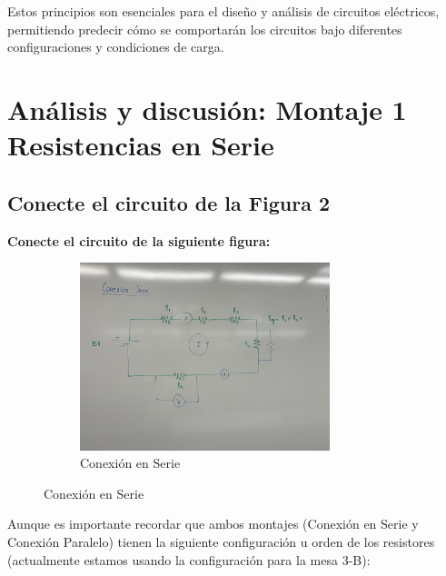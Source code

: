 Estos principios son esenciales para el diseño y análisis de circuitos eléctricos, permitiendo predecir cómo se comportarán los circuitos bajo diferentes configuraciones y condiciones de carga.


\section{Análisis y discusión: Montaje 1 Resistencias en Serie}

\subsection{Conecte el circuito de la Figura 2}
\textbf{Conecte el circuito de la siguiente figura:}

\begin{figure}[H]
    \centering
    \begin{subfigure}[b]{\textwidth}
        \centering
        \includegraphics[width=0.8\textwidth]{Figures/1. Content/ConexionSerie.jpg}
        \caption{Conexión en Serie}
        \label{fig: Conexion Serie}
    \end{subfigure}
    \hfill
\end{figure}

Aunque es importante recordar que ambos montajes (Conexión en Serie y Conexión
Paralelo) tienen la siguiente configuración u orden de los resistores
(actualmente estamos usando la configuración para la mesa 3-B):

